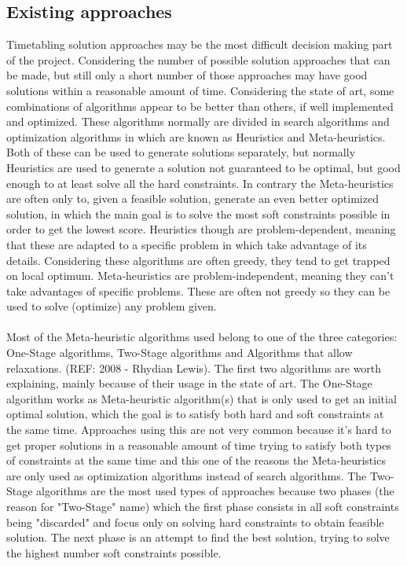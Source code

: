\subsection{Existing approaches}
\label{subsection:ExistingAppr}

Timetabling solution approaches may be the most difficult decision making part of the project. Considering the number of possible solution approaches that can be made, but still only a short number of those approaches may have good solutions within a reasonable amount of time. Considering the state of art, some combinations of algorithms appear to be better than others, if well implemented and optimized. These algorithms normally are divided in search algorithms and optimization algorithms in which are known as Heuristics and Meta-heuristics. Both of these can be used to generate solutions separately, but normally Heuristics are used to generate a solution not guaranteed to be optimal, but good enough to at least solve all the hard constraints. In contrary the Meta-heuristics are often only to, given a feasible solution, generate an even better optimized solution, in which the main goal is to solve the most soft constraints possible in order to get the lowest score. Heuristics though are problem-dependent, meaning that these are adapted to a specific problem in which take advantage of its details. Considering these algorithms are often greedy, they tend to get trapped on local optimum. Meta-heuristics are problem-independent, meaning they can't take advantages of specific problems. These are often not greedy so they can be used to solve (optimize) any problem given.\\
\\
Most of the Meta-heuristic algorithms used belong to one of the three categories: One-Stage algorithms, Two-Stage algorithms and Algorithms that allow relaxations. (REF: 2008 - Rhydian Lewis). The first two algorithms are worth explaining, mainly because of their usage in the state of art. The One-Stage algorithm works as Meta-heuristic algorithm(s) that is only used to get an initial optimal solution, which the goal is to satisfy both hard and soft constraints at the same time. Approaches using this are not very common because it's hard to get proper solutions in a reasonable amount of time trying to satisfy both types of constraints at the same time and this one of the reasons the Meta-heuristics are only used as optimization algorithms instead of search algorithms. The Two-Stage algorithms are the most used types of approaches because two phases (the reason for "Two-Stage" name) which the first phase consists in all soft constraints being "discarded" and focus only on solving hard constraints to obtain feasible solution. The next phase is an attempt to find the best solution, trying to solve the highest number soft constraints possible.\\
